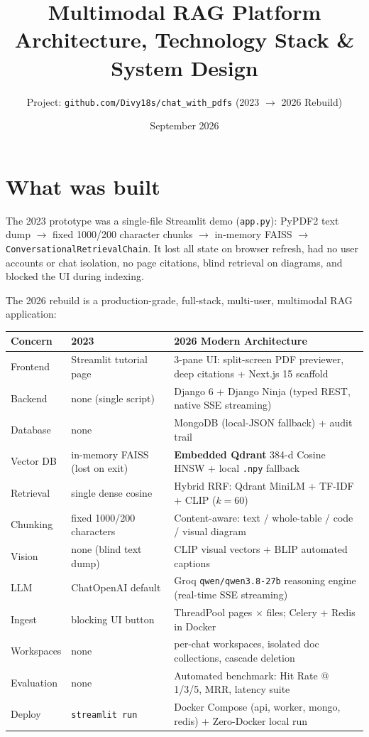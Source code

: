 \documentclass[11pt,a4paper]{article}
\title{Multimodal RAG Platform\\{\large Architecture, Technology Stack \& System Design}}
\author{Project: \texttt{github.com/Divy18s/chat\_with\_pdfs} (2023 $\rightarrow$ 2026 Rebuild)}
\date{September 2026}
\begin{document}
\maketitle
\tableofcontents
\newpage

\section{What was built}
The 2023 prototype was a single-file Streamlit demo (\texttt{app.py}): PyPDF2 text dump $\rightarrow$ fixed 1000/200 character chunks $\rightarrow$ in-memory FAISS $\rightarrow$ \texttt{ConversationalRetrievalChain}. It lost all state on browser refresh, had no user accounts or chat isolation, no page citations, blind retrieval on diagrams, and blocked the UI during indexing.

The 2026 rebuild is a production-grade, full-stack, multi-user, multimodal RAG application:
{\footnotesize
\begin{center}
\begin{tabular}{@{}lp{4.5cm}p{7.0cm}@{}}
\toprule
Concern & 2023 & 2026 Modern Architecture \\
\midrule
Frontend & Streamlit tutorial page & 3-pane UI: split-screen PDF previewer, deep citations + Next.js 15 scaffold \\
Backend & none (single script) & Django 6 + Django Ninja (typed REST, native SSE streaming) \\
Database & none & MongoDB (local-JSON fallback) + audit trail \\
Vector DB & in-memory FAISS (lost on exit) & \textbf{Embedded Qdrant} 384-d Cosine HNSW + local \texttt{.npy} fallback \\
Retrieval & single dense cosine & Hybrid RRF: Qdrant MiniLM + TF-IDF + CLIP ($k=60$) \\
Chunking & fixed 1000/200 characters & Content-aware: text / whole-table / code / visual diagram \\
Vision & none (blind text dump) & CLIP visual vectors + BLIP automated captions \\
LLM & ChatOpenAI default & Groq \texttt{qwen/qwen3.8-27b} reasoning engine (real-time SSE streaming) \\
Ingest & blocking UI button & ThreadPool pages $\times$ files; Celery + Redis in Docker \\
Workspaces & none & per-chat workspaces, isolated doc collections, cascade deletion \\
Evaluation & none & Automated benchmark: Hit Rate @ 1/3/5, MRR, latency suite \\
Deploy & \texttt{streamlit run} & Docker Compose (api, worker, mongo, redis) + Zero-Docker local run \\
\bottomrule
\end{tabular}
\end{center}
}
\end{document}
